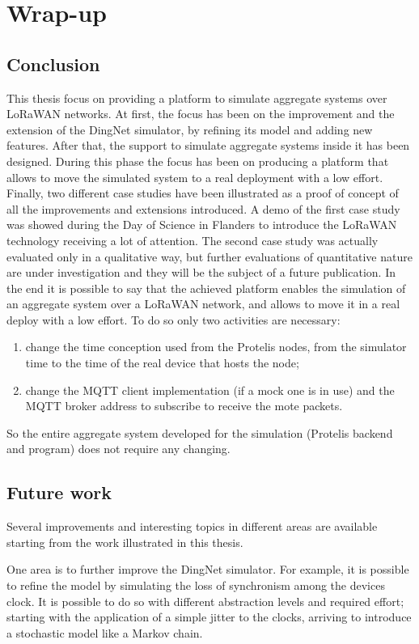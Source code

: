 \chapter{Wrap-up}
\label{chap:conclusions}
\section{Conclusion} 
This thesis focus on providing a platform to simulate aggregate systems over \mbox{LoRaWAN} networks.
At first, the focus has been on the improvement and the extension of the DingNet simulator, by refining its model and adding new features.
After that, the support to simulate aggregate systems inside it has been designed. 
During this phase the focus has been on producing a platform that allows to move the simulated system to a real deployment with a low effort.
Finally, two different case studies have been illustrated as a proof of concept of all the improvements and extensions introduced.
A demo of the first case study was showed during the Day of Science in Flanders to introduce the LoRaWAN technology receiving a lot of attention.
The second case study was actually evaluated only in a qualitative way, but further evaluations of quantitative nature are under investigation and they will be the subject of a future publication.
In the end it is possible to say that the achieved platform enables the simulation of an aggregate system over a LoRaWAN network, and allows to move it in a real deploy with a low effort. 
To do so only two activities are necessary:
\begin{enumerate}
    \item change the time conception used from the Protelis nodes, from the simulator time to the time of the real device that hosts the node;
    \item change the MQTT client implementation (if a mock one is in use) and the MQTT broker address to subscribe to receive the mote packets.
\end{enumerate}
 So the entire aggregate system developed for the simulation (Protelis backend and program) does not require any changing.

\section{Future work}
Several improvements and interesting topics in different areas are available starting from the work illustrated in this thesis.

One area is to further improve the DingNet simulator. 
For example, it is possible to refine the model by simulating the loss of synchronism among the devices clock. 
It is possible to do so with different abstraction levels and required effort; starting with the application of a simple jitter to the clocks, arriving to introduce a stochastic model like a Markov chain.

